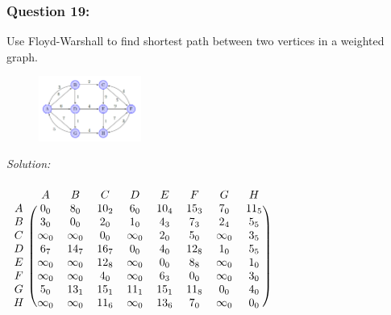 \documentclass[a4paper]{article}
\begin{document}
	\subsubsection*{Question 19:}
	Use Floyd-Warshall to find shortest path between two vertices in a weighted graph.
	\begin{figure}[H]
		\centering
		\includegraphics[width=0.3\textwidth]{tut919.png}
	\end{figure} 
	\textit{Solution:} \\ \\
	$\begin{blockarray}{ccccccccc}
		& A & B & C & D & E & F & G & H \\
		\begin{block}{c(cccccccc)}
			A & 0_0 & 8_0 & 10_2 & 6_0 & 10_4 & 15_3 & 7_0 & 11_5 \\
			B & 3_0 & 0_0 & 2_0 & 1_0 & 4_3 & 7_3 & 2_4 & 5_5 \\
			C & \infty_0 & \infty_0 & 0_0 & \infty_0 & 2_0 & 5_0 & \infty_0 & 3_5 \\
			D & 6_7 & 14_7 & 16_7 & 0_0 & 4_0 & 12_8 & 1_0 & 5_5 \\
			E & \infty_0 & \infty_0 & 12_8 & \infty_0 & 0_0 & 8_8 & \infty_0 & 1_0 \\
			F & \infty_0 & \infty_0 & 4_0 & \infty_0 & 6_3 & 0_0 & \infty_0 & 3_0 \\
			G & 5_0 & 13_1 & 15_1 & 11_1 & 15_1 & 11_8 & 0_0 & 4_0 \\
			H & \infty_0 & \infty_0 & 11_6 & \infty_0 & 13_6 & 7_0 & \infty_0 & 0_0 \\
		\end{block}
	\end{blockarray}$
	
\end{document}
